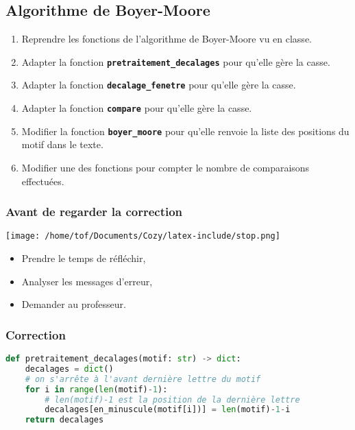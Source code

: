 \documentclass[svgnames,11pt]{beamer}
\begin{document}
\subsection{Algorithme de Boyer-Moore}
\begin{activite}
\begin{enumerate}
    \item Reprendre les fonctions de l'algorithme de Boyer-Moore vu en classe.
    \item Adapter la fonction \textbf{\texttt{pretraitement\_decalages}} pour qu'elle gère la casse.
    \item Adapter la fonction \textbf{\texttt{decalage\_fenetre}} pour qu'elle gère la casse.
    \item Adapter la fonction \textbf{\texttt{compare}} pour qu'elle gère la casse.
    \item Modifier la fonction \textbf{\texttt{boyer\_moore}} pour qu'elle renvoie la liste des positions du motif dans le texte.
    \item Modifier une des fonctions pour compter le nombre de comparaisons effectuées.
\end{enumerate}
\end{activite}
\begin{frame}
    \frametitle{Avant de regarder la correction}
\begin{center}
    \centering
    \texttt{[image: /home/tof/Documents/Cozy/latex-include/stop.png]}
    \end{center}
{\Large
    \begin{itemize}
        \item Prendre le temps de réfléchir,
        \item Analyser les messages d'erreur,
        \item Demander au professeur.
    \end{itemize}
}
\end{frame}
\begin{frame}[fragile]
    \frametitle{Correction}

    \begin{center}
    \begin{lstlisting}[language=Python , basicstyle=\ttfamily\small, xleftmargin=0.2em, xrightmargin=-4em]
def pretraitement_decalages(motif: str) -> dict:
    decalages = dict()
    # on s'arrête à l'avant dernière lettre du motif
    for i in range(len(motif)-1):
        # len(motif)-1 est la position de la dernière lettre
        decalages[en_minuscule(motif[i])] = len(motif)-1-i
    return decalages    
\end{lstlisting}
    \end{center}

\end{frame}
\end{document}
